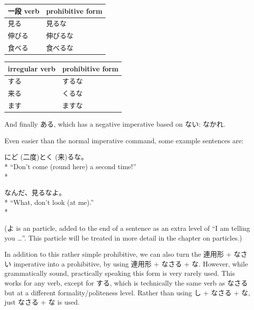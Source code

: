 \documentclass[11pt, b5paper, twoside, openright, onecolumn]{book}
\makeatletter
\newcommand*{\rubystack}[2]{{\relscale{0.5}%
  \begin{tabular}[b]{@{}c@{}}%
    {#1}\\%
   {\textscale{2}{#2}}%
  \end{tabular}}%
}
\DeclareRobustCommand*{\ruby}[2]{%
  \mbox{%
    \setlength{\parskip}{0ex}%
    \BeginAccSupp{method=pdfstringdef,ActualText={#1}}%
      \rubystack{\phantom{#2}}{#1}%
      \llap{%
        \rubystack{#2}{\phantom{#1}}%
      }%
    \EndAccSupp{}%
  }%
}
\renewcommand*{\ruby}[2]{#2 (#1)}%
\newenvironment{exampleblock}{
\setlength{\parindent}{0.6in}
\begin{minipage}[t]{\dimexpr\textwidth-\parindent}}
{\end{minipage}}
\newenvironment{mytabular}[1]{\noindent\hspace{0.4in}
\begin{tabular}[h]{#1}}{\end{tabular}}
\makeatother
\begin{document}
\smaller
\begin{mytabular}{| l  l |}\hline 
\rule{0pt}{2.4ex}一段 verb & prohibitive form\\ 
\hline
\rule{0pt}{2.4ex}見る & 見るな\\ 
\rule{0pt}{2.4ex}伸びる & 伸びるな\\ 
\rule{0pt}{2.4ex}食べる & 食べるな\\ 
\hline 
\end{mytabular}
\larger
\vspace{0.5cm}

\smaller
\begin{mytabular}{| l  l |}\hline 
\rule{0pt}{2.4ex}irregular verb & prohibitive form\\ 
\hline
\rule{0pt}{2.4ex}する & するな\\ 
\rule{0pt}{2.4ex}来る & くるな\\ 
\rule{0pt}{2.4ex}ます & ますな\\ 
\hline 
\end{mytabular}
\larger
\vspace{0.5cm}


And finally ある‚ which has a negative imperative based on ない: なかれ.

Even easier than the normal imperative command‚ some example sentences are:

\vspace{0.4cm}
\begin{exampleblock}
\ruby{二度}{にど}と\ruby{来}{く}るな。 \\* 
“Don’t come (round here) a second time!” \\* 
\end{exampleblock}
\vspace{0.2cm}

\begin{exampleblock}
なんだ、見るなよ。 \\* 
“What‚ don’t look (at me).” \\* 
\end{exampleblock}
\vspace{0.2cm}

(よ is an  particle‚ added to the end of a sentence as an extra level of “I am telling you …”. This particle will be treated in more detail in the chapter on particles.)

In addition to this rather simple prohibitive‚ we can also turn the 連用形 + なさい imperative into a prohibitive‚ by using 連用形 + なさる + な. However‚ while grammatically sound‚ practically speaking this form is very rarely used. This works for any verb‚ except for する‚ which is technically the same verb as なさる but at a different formality/politeness level. Rather than using し + なさる + な‚ just なさる + な is used.
\end{document}
